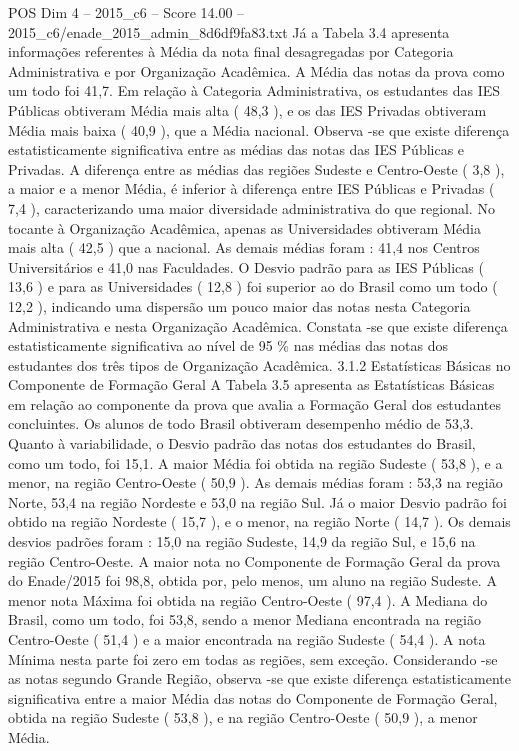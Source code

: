 \begin{textsample}{POS Dim 4 – 2015\_c6 – Score 14.00 – 2015\_c6/enade\_2015\_admin\_8d6df9fa83.txt}
Já a Tabela 3.4 apresenta informações referentes à Média da nota final desagregadas por Categoria Administrativa e por Organização Acadêmica.
A Média das notas da prova como um todo foi 41,7.
Em relação à Categoria Administrativa, os estudantes das IES Públicas obtiveram Média mais alta ( 48,3 ), e os das IES Privadas obtiveram Média mais baixa ( 40,9 ), que a Média nacional.
Observa -se que existe diferença estatisticamente significativa entre as médias das notas das IES Públicas e Privadas.
A diferença entre as médias das regiões Sudeste e Centro-Oeste ( 3,8 ), a maior e a menor Média, é inferior à diferença entre IES Públicas e Privadas ( 7,4 ), caracterizando uma maior diversidade administrativa do que regional.
No tocante à Organização Acadêmica, apenas as Universidades obtiveram Média mais alta ( 42,5 ) que a nacional.
As demais médias foram : 41,4 nos Centros Universitários e 41,0 nas Faculdades.
O Desvio padrão para as IES Públicas ( 13,6 ) e para as Universidades ( 12,8 ) foi superior ao do Brasil como um todo ( 12,2 ), indicando uma dispersão um pouco maior das notas nesta Categoria Administrativa e nesta Organização Acadêmica.
Constata -se que existe diferença estatisticamente significativa ao nível de 95 \% nas médias das notas dos estudantes dos três tipos de Organização Acadêmica. 3.1.2 Estatísticas Básicas no Componente de Formação Geral A Tabela 3.5 apresenta as Estatísticas Básicas em relação ao componente da prova que avalia a Formação Geral dos estudantes concluintes.
Os alunos de todo Brasil obtiveram desempenho médio de 53,3.
Quanto à variabilidade, o Desvio padrão das notas dos estudantes do Brasil, como um todo, foi 15,1.
A maior Média foi obtida na região Sudeste ( 53,8 ), e a menor, na região Centro-Oeste ( 50,9 ).
As demais médias foram : 53,3 na região Norte, 53,4 na região Nordeste e 53,0 na região Sul.
Já o maior Desvio padrão foi obtido na região Nordeste ( 15,7 ), e o menor, na região Norte ( 14,7 ).
Os demais desvios padrões foram : 15,0 na região Sudeste, 14,9 da região Sul, e 15,6 na região Centro-Oeste.
A maior nota no Componente de Formação Geral da prova do Enade/2015 foi 98,8, obtida por, pelo menos, um aluno na região Sudeste.
A menor nota Máxima foi obtida na região Centro-Oeste ( 97,4 ).
A Mediana do Brasil, como um todo, foi 53,8, sendo a menor Mediana encontrada na região Centro-Oeste ( 51,4 ) e a maior encontrada na região Sudeste ( 54,4 ).
A nota Mínima nesta parte foi zero em todas as regiões, sem exceção.
Considerando -se as notas segundo Grande Região, observa -se que existe diferença estatisticamente significativa entre a maior Média das notas do Componente de Formação Geral, obtida na região Sudeste ( 53,8 ), e na região Centro-Oeste ( 50,9 ), a menor Média.

\end{textsample}

